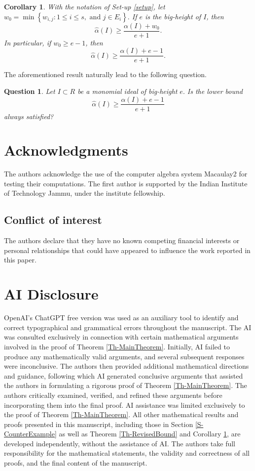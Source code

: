 \documentclass[12pt,reqno]{amsart}
\newtheorem{corollary}[thm]{Corollary}
\newtheorem{question}[thm]{Question}
\theoremstyle{definition}
\newcommand{\ww}{\widehat{\alpha}}
\numberwithin{equation}{section}
\begin{document}
\begin{corollary}\label{C-RevisedBound}
    With the notation of Set-up \ref{setup}, let $w_0 = \min \left\{w_{i, j} : 1 \le i \le s, \text{ and } j \in E_i \right\}.$ If $e$ is the big-height of $I$, then
    \[\ww(I) \ge \dfrac{\alpha(I) + w_0}{e + 1}.\]
    In particular, if $w_0 \ge e - 1$, then 
    \[\ww(I) \ge \dfrac{\alpha(I) + e - 1}{e + 1}.\]
\end{corollary}

The aforementioned result naturally lead to the following question. 

\begin{question}
    Let $I \subset R$ be a monomial ideal of big-height $e.$ Is the lower bound \[\ww(I) \ge \dfrac{\alpha(I) + e - 1}{e + 1}\] always satisfied? 
\end{question}

\section*{Acknowledgments}

The authors acknowledge the use of the computer algebra system Macaulay2 \cite{M2}  for testing their computations. The first author is supported by the Indian Institute of Technology Jammu, under the institute fellowship.

\subsection*{Conflict of interest} The authors declare that they have no known competing financial interests or personal relationships that could have appeared to influence the work reported in this paper.

\section* {AI Disclosure}

OpenAI’s ChatGPT free version was used as an auxiliary tool to identify and correct typographical and grammatical errors throughout the manuscript. The AI was consulted exclusively in connection with certain mathematical arguments involved in the proof of Theorem \ref{Th-MainTheorem}. Initially, AI failed to produce any mathematically valid arguments, and several subsequent responses were inconclusive. The authors then provided additional mathematical directions and guidance, following which AI generated conclusive arguments that assisted the authors in formulating a rigorous proof of Theorem \ref{Th-MainTheorem}. The authors critically examined, verified, and refined these arguments before incorporating them into the final proof. AI assistance was limited exclusively to the proof of Theorem \ref{Th-MainTheorem}. All other mathematical results and proofs presented in this manuscript, including those in Section \ref{S-CounterExample} as well as Theorem \ref{Th-RevisedBound} and Corollary \ref{C-RevisedBound}, are developed independently, without the assistance of AI. The authors take full responsibility for the mathematical statements, the validity and correctness of all proofs, and the final content of the manuscript.





\end{document}
